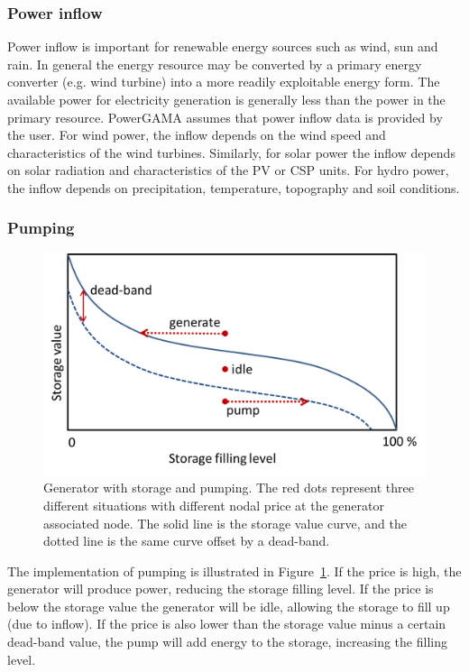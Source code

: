 \documentclass{article}
\begin{document}
\subsubsection{Power inflow}
Power inflow is important for renewable energy sources such as wind, sun and rain. In general the energy resource may be converted by a primary energy converter (e.g. wind turbine) into a more readily exploitable energy form. The available power for electricity generation is generally less than the power in the primary resource.  PowerGAMA assumes that power inflow data is provided by the user.
For wind power, the inflow depends on the wind speed and characteristics of the wind turbines.
Similarly, for solar power the inflow depends on solar radiation and characteristics of the PV or CSP units.
For hydro power, the inflow depends on precipitation, temperature, topography and soil conditions.


\subsubsection{Pumping}
\begin{figure}
\centering
\includegraphics[scale=0.6]{generate_idle_pump2.png}
\caption{Generator with storage and pumping. The red dots represent three different situations with different nodal price at the generator associated node. The solid line is the storage value curve, and the dotted line is the same curve offset by a dead-band.}
\label{fig:pumping_model}
\end{figure}

The implementation of pumping is illustrated in Figure~\ref{fig:pumping_model}.
If the price is high, the generator will produce power, reducing the storage filling level. If the price is below the storage value the generator will be idle, allowing the storage to fill up (due to inflow). If the price is also lower than the storage value minus a certain dead-band value, the pump will add energy to the storage, increasing the filling level.
\end{document}
